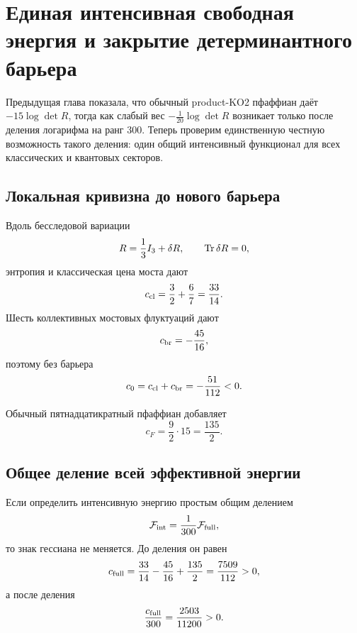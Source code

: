 \chapter{Единая интенсивная свободная энергия и закрытие детерминантного барьера}

Предыдущая глава показала, что обычный product-KO2 пфаффиан даёт
$-15\log\det R$, тогда как слабый вес $-\frac1{20}\log\det R$ возникает
только после деления логарифма на ранг $300$. Теперь проверим единственную
честную возможность такого деления: один общий интенсивный функционал для
всех классических и квантовых секторов.

\section{Локальная кривизна до нового барьера}

Вдоль бесследовой вариации
\begin{equation}
 R=\frac13I_3+\delta R,
 \qquad \operatorname{Tr}\delta R=0,
\end{equation}
энтропия и классическая цена моста дают
\begin{equation}
 c_{\rm cl}=\frac32+\frac67=\frac{33}{14}.
\end{equation}
Шесть коллективных мостовых флуктуаций дают
\begin{equation}
 c_{\rm br}=-\frac{45}{16},
\end{equation}
поэтому без барьера
\begin{equation}
 c_0=c_{\rm cl}+c_{\rm br}=-\frac{51}{112}<0.
 \label{eq:v6-common-intensive-baseline}
\end{equation}

Обычный пятнадцатикратный пфаффиан добавляет
\begin{equation}
 c_F=\frac92\cdot15=\frac{135}{2}.
 \label{eq:v6-common-intensive-ordinary-fermion}
\end{equation}

\section{Общее деление всей эффективной энергии}

Если определить интенсивную энергию простым общим делением
\begin{equation}
 \mathcal F_{\rm int}=\frac1{300}\mathcal F_{\rm full},
\end{equation}
то знак гессиана не меняется. До деления он равен
\begin{equation}
 c_{\rm full}
 =\frac{33}{14}-\frac{45}{16}+\frac{135}{2}
 =\frac{7509}{112}>0,
\end{equation}
а после деления
\begin{equation}
 \frac{c_{\rm full}}{300}
 =\frac{2503}{11200}>0.
\end{equation}

